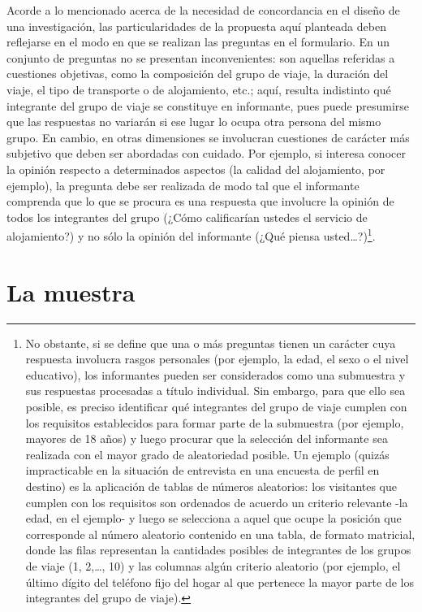 \documentclass[
]{book}
\begin{document}
Acorde a lo mencionado acerca de la necesidad de concordancia en el diseño de una investigación, las particularidades de la propuesta aquí planteada deben reflejarse en el modo en que se realizan las preguntas en el formulario. En un conjunto de preguntas no se presentan inconvenientes: son aquellas referidas a cuestiones objetivas, como la composición del grupo de viaje, la duración del viaje, el tipo de transporte o de alojamiento, etc.; aquí, resulta indistinto qué integrante del grupo de viaje se constituye en informante, pues puede presumirse que las respuestas no variarán si ese lugar lo ocupa otra persona del mismo grupo. En cambio, en otras dimensiones se involucran cuestiones de carácter más subjetivo que deben ser abordadas con cuidado. Por ejemplo, si interesa conocer la opinión respecto a determinados aspectos (la calidad del alojamiento, por ejemplo), la pregunta debe ser realizada de modo tal que el informante comprenda que lo que se procura es una respuesta que involucre la opinión de todos los integrantes del grupo (¿Cómo calificarían ustedes el servicio de alojamiento?) y no sólo la opinión del informante (¿Qué piensa usted\ldots?)\footnote{No obstante, si se define que una o más preguntas tienen un carácter cuya respuesta involucra rasgos personales (por ejemplo, la edad, el sexo o el nivel educativo), los informantes pueden ser considerados como una submuestra y sus respuestas procesadas a título individual. Sin embargo, para que ello sea posible, es preciso identificar qué integrantes del grupo de viaje cumplen con los requisitos establecidos para formar parte de la submuestra (por ejemplo, mayores de 18 años) y luego procurar que la selección del informante sea realizada con el mayor grado de aleatoriedad posible. Un ejemplo (quizás impracticable en la situación de entrevista en una encuesta de perfil en destino) es la aplicación de tablas de números aleatorios: los visitantes que cumplen con los requisitos son ordenados de acuerdo un criterio relevante -la edad, en el ejemplo- y luego se selecciona a aquel que ocupe la posición que corresponde al número aleatorio contenido en una tabla, de formato matricial, donde las filas representan la cantidades posibles de integrantes de los grupos de viaje (1, 2,\ldots, 10) y las columnas algún criterio aleatorio (por ejemplo, el último dígito del teléfono fijo del hogar al que pertenece la mayor parte de los integrantes del grupo de viaje).}.

\hypertarget{la-muestra}{%
\section{La muestra}\label{la-muestra}}
\end{document}
